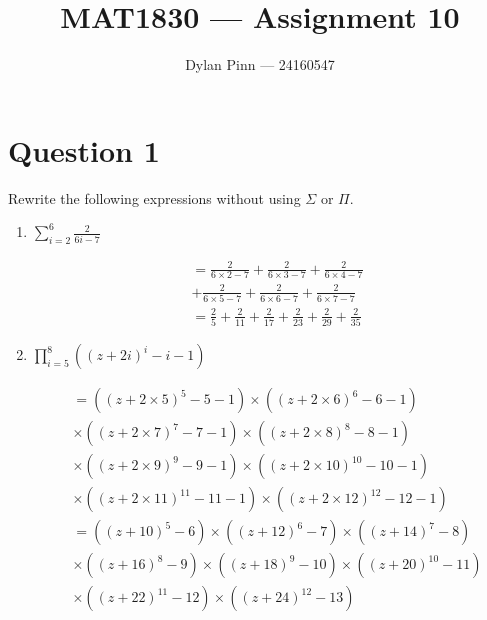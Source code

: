 \documentclass[11pt]{article}
\begin{document}
\title{MAT1830 --- Assignment 10}
\author{Dylan Pinn --- 24160547}
\maketitle

\section*{Question 1}
Rewrite the following expressions without using $\Sigma$ or $\Pi$.

\begin{enumerate}[label= (\alph*)]
  \item $\sum_{i=2}^{6} \frac{2}{6i - 7}$

  \begin{align*}
    &= \frac{2}{6 \times 2 - 7} + \frac{2}{6 \times 3 - 7} + \frac{2}{6 \times
    4 - 7} \\
    &+ \frac{2}{6 \times 5 - 7} + \frac{2}{6 \times 6 - 7} + \frac{2}{6 \times
    7 - 7} \\
    &= \frac{2}{5} + \frac{2}{11} + \frac{2}{17} + \frac{2}{23} + \frac{2}{29} +
    \frac{2}{35}
  \end{align*}

  \item $\prod_{i=5}^{8} ({(z + 2i)}^{i} - i - 1)$

    \begin{align*}
      &= ({(z + 2 \times 5)}^{5} - 5 - 1) \times ({(z + 2 \times 6)}^{6} - 6 -
      1) \\
      &\times ({(z + 2 \times 7)}^{7} - 7 - 1) \times ({(z + 2 \times 8)}^{8} - 8
      - 1) \\
      &\times ({(z + 2 \times 9)}^{9} - 9 - 1) \times ({(z + 2 \times 10)}^{10}
      - 10 - 1) \\
      &\times ({(z + 2 \times 11)}^{11} - 11 - 1) \times ({(z + 2 \times
      12)}^{12} - 12 - 1) \\
      &= ({(z + 10)}^{5} - 6) \times ({(z + 12)}^{6} - 7) \times ({(z + 14)}^{7}
      - 8) \\
      &\times ({(z + 16)}^{8} - 9) \times ({(z + 18)}^{9} - 10) \times ({(z +
      20)}^{10} - 11) \\
      &\times ({(z + 22)}^{11} - 12) \times ({(z + 24)}^{12} - 13) \\
    \end{align*}

\end{enumerate}
\end{document}
